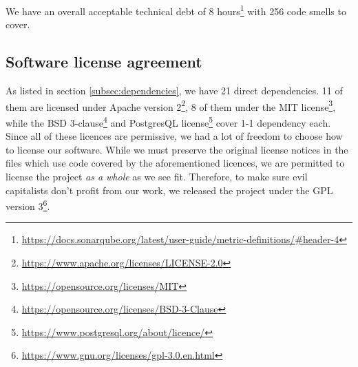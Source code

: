 \documentclass[report/main.tex]{subfiles}
\begin{document}
        We have an overall acceptable technical debt of 8 hours\footnote{\hyperlink{SonarCloud documentation}{https://docs.sonarqube.org/latest/user-guide/metric-definitions/#header-4}} with 256 code smells to cover. 

        

    \subsection{Software license agreement}
        As listed in section \ref{subsec:dependencies}, we have 21 direct dependencies. 11 of them are licensed under Apache version 2\footnote{\hyperlink{apache}{https://www.apache.org/licenses/LICENSE-2.0}}, 8 of them under the MIT license\footnote{\hyperlink{MIT license}{https://opensource.org/licenses/MIT}}, while the BSD 3-clause\footnote{\hyperlink{opensource.org}{https://opensource.org/licenses/BSD-3-Clause}} and PostgresQL license\footnote{\hyperlink{psql}{https://www.postgresql.org/about/licence/}} cover 1-1 dependency each. Since all of these licences are permissive, we had a lot of freedom to choose how to license our software. While we must preserve the original license notices in the files which use code covered by the aforementioned licences, we are permitted to license the project \textit{as a whole} as we see fit. Therefore, to make sure evil capitalists don't profit from our work, we released the project under the GPL version 3\footnote{\hyperlink{gnu}{https://www.gnu.org/licenses/gpl-3.0.en.html}}.
    
\end{document}

